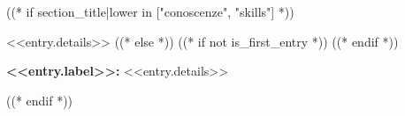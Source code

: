 ((* if section_title|lower in ["conoscenze", "skills"] *))
\item[<<entry.label>>:] <<entry.details>>
((* else *))
((* if not is_first_entry *))
\vspace{<<design.margins.entry_area.vertical_between>>}
((* endif *))

\begin{onecolentry}
    \textbf{<<entry.label>>:} <<entry.details>>
\end{onecolentry}
((* endif *))
